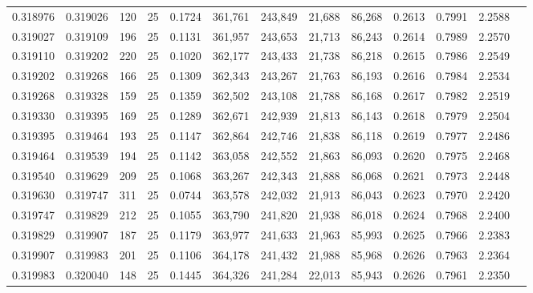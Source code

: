 \begin{tabular}{rrrrrrrrrrrrr}
0.318976 & 0.319026 &   120 &  25 &                                     0.1724 & 361,761 & 243,849 &  21,688 &  86,268 & 0.2613 & 0.7991 & 2.2588 \\
0.319027 & 0.319109 &   196 &  25 &                                     0.1131 & 361,957 & 243,653 &  21,713 &  86,243 & 0.2614 & 0.7989 & 2.2570 \\
0.319110 & 0.319202 &   220 &  25 &                                     0.1020 & 362,177 & 243,433 &  21,738 &  86,218 & 0.2615 & 0.7986 & 2.2549 \\
0.319202 & 0.319268 &   166 &  25 &                                     0.1309 & 362,343 & 243,267 &  21,763 &  86,193 & 0.2616 & 0.7984 & 2.2534 \\
0.319268 & 0.319328 &   159 &  25 &                                     0.1359 & 362,502 & 243,108 &  21,788 &  86,168 & 0.2617 & 0.7982 & 2.2519 \\
0.319330 & 0.319395 &   169 &  25 &                                     0.1289 & 362,671 & 242,939 &  21,813 &  86,143 & 0.2618 & 0.7979 & 2.2504 \\
0.319395 & 0.319464 &   193 &  25 &                                     0.1147 & 362,864 & 242,746 &  21,838 &  86,118 & 0.2619 & 0.7977 & 2.2486 \\
0.319464 & 0.319539 &   194 &  25 &                                     0.1142 & 363,058 & 242,552 &  21,863 &  86,093 & 0.2620 & 0.7975 & 2.2468 \\
0.319540 & 0.319629 &   209 &  25 &                                     0.1068 & 363,267 & 242,343 &  21,888 &  86,068 & 0.2621 & 0.7973 & 2.2448 \\
0.319630 & 0.319747 &   311 &  25 &                                     0.0744 & 363,578 & 242,032 &  21,913 &  86,043 & 0.2623 & 0.7970 & 2.2420 \\
0.319747 & 0.319829 &   212 &  25 &                                     0.1055 & 363,790 & 241,820 &  21,938 &  86,018 & 0.2624 & 0.7968 & 2.2400 \\
0.319829 & 0.319907 &   187 &  25 &                                     0.1179 & 363,977 & 241,633 &  21,963 &  85,993 & 0.2625 & 0.7966 & 2.2383 \\
0.319907 & 0.319983 &   201 &  25 &                                     0.1106 & 364,178 & 241,432 &  21,988 &  85,968 & 0.2626 & 0.7963 & 2.2364 \\
0.319983 & 0.320040 &   148 &  25 &                                     0.1445 & 364,326 & 241,284 &  22,013 &  85,943 & 0.2626 & 0.7961 & 2.2350 \\

\end{tabular}
